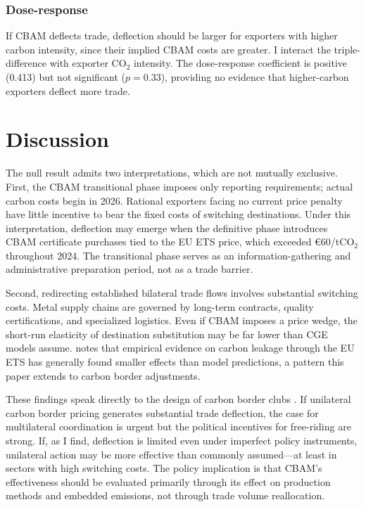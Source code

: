 \documentclass[12pt]{article}
\begin{document}
\subsubsection*{Dose-response} If CBAM deflects trade, deflection should be larger for exporters with higher carbon intensity, since their implied CBAM costs are greater. I interact the triple-difference with exporter CO$_2$ intensity. The dose-response coefficient is positive (0.413) but not significant ($p = 0.33$), providing no evidence that higher-carbon exporters deflect more trade.

\section{Discussion}

The null result admits two interpretations, which are not mutually exclusive. First, the CBAM transitional phase imposes only reporting requirements; actual carbon costs begin in 2026. Rational exporters facing no current price penalty have little incentive to bear the fixed costs of switching destinations. Under this interpretation, deflection may emerge when the definitive phase introduces CBAM certificate purchases tied to the EU ETS price, which exceeded \euro{}60/tCO$_2$ throughout 2024. The transitional phase serves as an information-gathering and administrative preparation period, not as a trade barrier.

Second, redirecting established bilateral trade flows involves substantial switching costs. Metal supply chains are governed by long-term contracts, quality certifications, and specialized logistics. Even if CBAM imposes a price wedge, the short-run elasticity of destination substitution may be far lower than CGE models assume. \citet{verde2020} notes that empirical evidence on carbon leakage through the EU ETS has generally found smaller effects than model predictions, a pattern this paper extends to carbon border adjustments.

These findings speak directly to the design of carbon border clubs \citep{nordhaus2015}. If unilateral carbon border pricing generates substantial trade deflection, the case for multilateral coordination is urgent but the political incentives for free-riding are strong. If, as I find, deflection is limited even under imperfect policy instruments, unilateral action may be more effective than commonly assumed---at least in sectors with high switching costs. The policy implication is that CBAM's effectiveness should be evaluated primarily through its effect on production methods and embedded emissions, not through trade volume reallocation.
\end{document}
